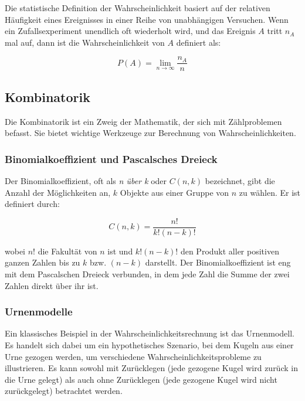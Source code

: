 Die statistische Definition der Wahrscheinlichkeit basiert auf der relativen Häufigkeit eines Ereignisses in einer Reihe von unabhängigen Versuchen.
Wenn ein Zufallsexperiment unendlich oft wiederholt wird, und das Ereignis $A$ tritt $n_A$ mal auf, dann ist die Wahrscheinlichkeit von $A$ definiert als:

\begin{equation}
    P(A) = \lim_{{n \to \infty}} \frac{n_A}{n}
\end{equation}

\subsection{Kombinatorik}

Die Kombinatorik ist ein Zweig der Mathematik, der sich mit Zählproblemen befasst.
Sie bietet wichtige Werkzeuge zur Berechnung von Wahrscheinlichkeiten.

\subsubsection{Binomialkoeffizient und Pascalsches Dreieck}

Der Binomialkoeffizient, oft als \textit{n über k} oder $C(n, k)$ bezeichnet, gibt die Anzahl der Möglichkeiten an, $k$ Objekte aus einer Gruppe von $n$ zu wählen.
Er ist definiert durch:

\begin{equation}
    C(n, k) = \frac{n!}{k!(n-k)!}
\end{equation}

wobei $n!$ die Fakultät von $n$ ist und $k!(n-k)!$ den Produkt aller positiven ganzen Zahlen bis zu $k$ bzw. $(n-k)$ darstellt.
Der Binomialkoeffizient ist eng mit dem Pascalschen Dreieck verbunden, in dem jede Zahl die Summe der zwei Zahlen direkt über ihr ist.

\subsubsection{Urnenmodelle}

Ein klassisches Beispiel in der Wahrscheinlichkeitsrechnung ist das Urnenmodell.
Es handelt sich dabei um ein hypothetisches Szenario, bei dem Kugeln aus einer Urne gezogen werden, um verschiedene Wahrscheinlichkeitsprobleme zu illustrieren.
Es kann sowohl mit Zurücklegen (jede gezogene Kugel wird zurück in die Urne gelegt) als auch ohne Zurücklegen (jede gezogene Kugel wird nicht zurückgelegt) betrachtet werden.

